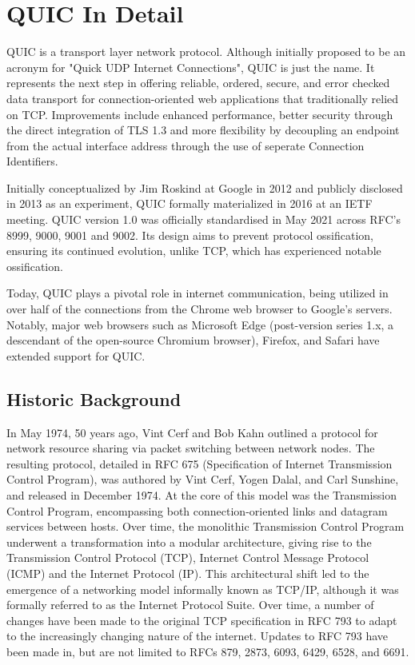 \chapter{QUIC In Detail}

QUIC is a transport layer network protocol. Although initially proposed to be an acronym for "Quick UDP Internet Connections",
QUIC is just the name\cite[10]{rfc9000}. It represents the next step in offering reliable, ordered, secure, and error checked data transport
for connection-oriented web applications that traditionally relied on TCP. Improvements include enhanced performance, better
security through the direct integration of TLS 1.3 and more flexibility by decoupling an endpoint from the actual interface
address through the use of seperate Connection Identifiers. 

Initially conceptualized by Jim Roskind at Google in 2012 and publicly disclosed in 2013 as an experiment, QUIC formally
materialized in 2016 at an IETF meeting. QUIC version 1.0 was officially standardised in May 2021 across RFC's 8999\cite{rfc8999},
9000\cite{rfc9000}, 9001\cite{rfc9001} and 9002\cite{rfc9002}. Its design aims to prevent protocol ossification, ensuring its
continued evolution, unlike TCP, which has experienced notable ossification.

Today, QUIC plays a pivotal role in internet communication, being utilized in over half of the connections from the Chrome web
browser to Google's servers. Notably, major web browsers such as Microsoft Edge (post-version series 1.x, a descendant of the
open-source Chromium browser), Firefox, and Safari have extended support for QUIC.

\section{Historic Background}

In May 1974, 50 years ago, Vint Cerf and Bob Kahn outlined a protocol for network resource sharing via packet switching between
network nodes. The resulting protocol, detailed in RFC 675 (Specification of Internet Transmission Control Program), was authored
by Vint Cerf, Yogen Dalal, and Carl Sunshine, and released in December 1974. At the core of this model was the Transmission
Control Program, encompassing both connection-oriented links and datagram services between hosts. Over time, the monolithic
Transmission Control Program underwent a transformation into a modular architecture, giving rise to the Transmission Control
Protocol (TCP), Internet Control Message Protocol (ICMP) and the Internet Protocol (IP). This architectural shift led to the
emergence of a networking model informally known as TCP/IP, although it was formally referred to as the Internet Protocol Suite.
Over time, a number of changes have been made to the original TCP specification in RFC 793 to adapt to the increasingly changing
nature of the internet. Updates to RFC 793 have been made in, but are not limited to RFCs 879, 2873, 6093, 6429, 6528, and 6691. \\

